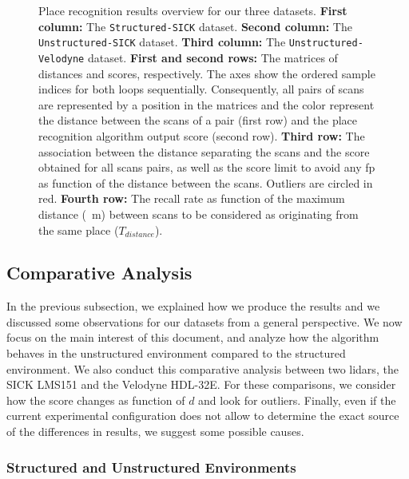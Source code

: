 \begin{figure}
    \caption[Place recognition results overview for our three datasets.]{Place recognition results overview for our three datasets. \textbf{First column:} The \texttt{Structured-SICK} dataset. \textbf{Second column:} The \texttt{Unstructured-SICK} dataset. \textbf{Third column:} The \texttt{Unstructured-Velodyne} dataset. \textbf{First and second rows:} The matrices of distances and scores, respectively. The axes show the ordered sample indices for both loops sequentially. Consequently, all pairs of scans are represented by a position in the matrices and the color represent the distance between the scans of a pair (first row) and the place recognition algorithm output score (second row). \textbf{Third row:} The association between the distance separating the scans and the score obtained for all scans pairs, as well as the score limit to avoid any \gls*{fp} as function of the distance between the scans. Outliers are circled in red. \textbf{Fourth row:} The recall rate as function of the maximum distance (\SI{}{\meter}) between scans to be considered as originating from the same place ($T_{distance}$).} 
    \label{fig:chap_slam_results}
\end{figure}

\subsection{Comparative Analysis}
\label{ssec:chap_slam_comparative_analysis}

In the previous subsection, we explained how we produce the results and we discussed some observations for our datasets from a general perspective. We now focus on the main interest of this document, and analyze how the algorithm behaves in the unstructured environment compared to the structured environment. We also conduct this comparative analysis between two \gls*{lidar}s, the SICK LMS151 and the Velodyne HDL-32E. For these comparisons, we consider how the score changes as function of $d$ and look for outliers. Finally, even if the current experimental configuration does not allow to determine the exact source of the differences in results, we suggest some possible causes.


\subsubsection{Structured and Unstructured Environments}
\label{ssec:chap_slam_struct_vs_forest}

